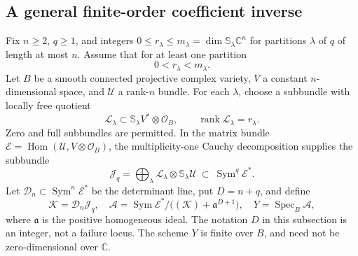 \documentclass[11pt,reqno]{amsart}
\numberwithin{equation}{section}
\theoremstyle{definition}\newtheorem{definition}[theorem]{Definition}
\theoremstyle{remark}\newtheorem{remark}[theorem]{Remark}
\newcommand{\C}{\mathbb C}\newcommand{\Q}{\mathbb Q}
\newcommand{\OO}{\mathcal O}\newcommand{\II}{\mathcal I}
\DeclareMathOperator{\Sym}{Sym}\DeclareMathOperator{\Gr}{Gr}
\DeclareMathOperator{\Hom}{Hom}\DeclareMathOperator{\Tot}{Tot}
\DeclareMathOperator{\rank}{rank}\DeclareMathOperator{\Proj}{Proj}
\DeclareMathOperator{\Spec}{Spec}\DeclareMathOperator{\PGL}{PGL}
\begin{document}
\subsection{A general finite-order coefficient inverse}
Fix \(n\ge2\), \(q\ge1\), and integers
\(0\le r_\lambda\le m_\lambda=\dim\mathbb S_\lambda\C^n\)
for partitions \(\lambda\) of \(q\) of length at most \(n\).
Assume that for at least one partition
\begin{equation}\label{eq:strict-support-v147}
                         0<r_\lambda<m_\lambda.
\end{equation}
Let \(B\) be a smooth connected projective complex variety,
\(V\) a constant \(n\)-dimensional space, and \(\mathcal U\)
a rank-\(n\) bundle.  For each \(\lambda\), choose a subbundle
with locally free quotient
\[
 \mathcal L_\lambda\subset\mathbb S_\lambda V^*\otimes\OO_B,
                       \qquad\rank\mathcal L_\lambda=r_\lambda.
\]
Zero and full subbundles are permitted.  In the matrix bundle
\(\mathcal E=\Hom(\mathcal U,V\otimes\OO_B)\), the
multiplicity-one Cauchy decomposition supplies the subbundle
\begin{equation}\label{eq:general-moving-coeff-v147}
 \mathcal J_q=\bigoplus_\lambda
       \mathcal L_\lambda\otimes\mathbb S_\lambda\mathcal U
             \ \subset\ \Sym^q\mathcal E^*.
\end{equation}
Let \(\mathcal D_n\subset\Sym^n\mathcal E^*\) be the
determinant line, put \(D=n+q\), and define
\begin{equation}\label{eq:coefficient-thickening-v147}
 \mathcal K=\mathcal D_n\mathcal J_q,
 \quad \mathcal A=\Sym\mathcal E^*/\bigl((\mathcal K)
                                  +\mathfrak a^{D+1}\bigr),
 \quad Y=\Spec_B\mathcal A,
\end{equation}
where \(\mathfrak a\) is the positive homogeneous ideal.  The
notation \(D\) in this subsection is an integer, not a failure
locus.  The scheme \(Y\) is finite over \(B\), and need not be
zero-dimensional over \(\C\).
\end{document}
